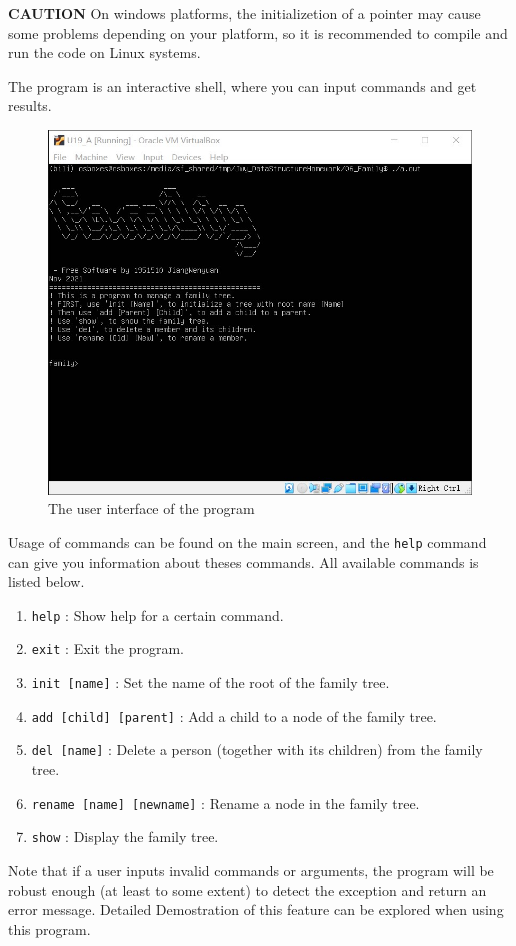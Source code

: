 \documentclass[cn,black,12pt,normal]{elegantnote}
\begin{document}
\textbf{CAUTION} On windows platforms, the initializetion of a pointer may cause some problems depending on your platform, so it is recommended to compile and run the code on Linux systems.

The program is an interactive shell, where you can input commands and get results.

\begin{figure}[H]
    \centering
    \includegraphics[width=0.7\linewidth]{image/f01.jpg}
    \caption{The user interface of the program}
\end{figure}

Usage of commands can be found on the main screen, and the \lstinline{help} command can give you information about theses commands.  All available commands is listed below.

\begin{enumerate}
    \item \lstinline{help} : Show help for a certain command.
    \item \lstinline{exit} : Exit the program.
    \item \lstinline{init [name]} : Set the name of the root of the family tree.
    \item \lstinline{add [child] [parent]} : Add a child to a node of the family tree.
    \item \lstinline{del [name]} : Delete a person (together with its children) from the family tree.
    \item \lstinline{rename [name] [newname]} : Rename a node in the family tree.
    \item \lstinline{show} : Display the family tree.
\end{enumerate}
Note that if a user inputs invalid commands or arguments, the program will be robust enough (at least to some extent) to detect the exception and return an error message. Detailed Demostration of this feature can be explored when using this program.
\end{document}
